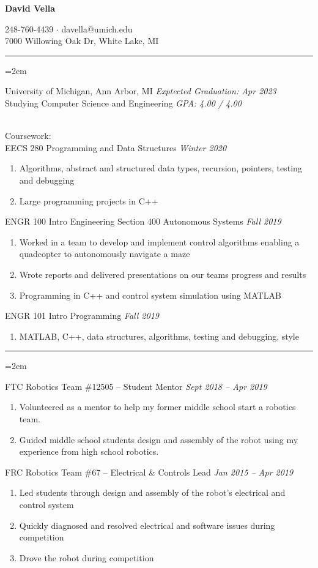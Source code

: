 \documentclass[12pt]{article}
\newcommand{\rheader}[1] { 
    \noindent{ \large \textbf{#1} \par }
    \vspace{-10pt}
    \noindent \rule{7.5in}{0.5pt} 
}
\newcommand{\rdate}[1]{
    \hfill \textit{#1}
}
\newcommand{\ritem} {
    \vspace{-10pt} \item
}
\newenvironment{rsection} {
    \vspace{-5pt}
    \par \medskip
    \leftskip=2em
    \noindent \ignorespaces
} {
    \par \medskip
    \vspace{5pt}
}
\newenvironment{rlist} {
    \begin{enumerate}[leftmargin=0.75in, label=$\bullet$]
} {
    \end{enumerate}
    \vspace{-10pt}
}
\begin{document}
\begin{center}
    {\Large \textbf{David Vella} \par}
    \vspace{5pt}
    248-760-4439 $\cdot$ davella@umich.edu \\
    7000 Willowing Oak Dr, White Lake, MI
\end{center}


\rheader{EDUCATION}
\begin{rsection}
    University of Michigan, Ann Arbor, MI \rdate{Exptected Graduation: Apr 2023} \\
    Studying Computer Science and Engineering \rdate{GPA: 4.00 / 4.00}
    \vspace{5pt} \\
    \noindent Coursework: \\
    EECS 280 Programming and Data Structures \rdate{Winter 2020}
    \begin{rlist}
        \ritem Algorithms, abstract and structured data types, recursion, pointers, testing and debugging
        \ritem Large programming projects in C++
    \end{rlist}
    ENGR 100 Intro Engineering Section 400 Autonomous Systems \rdate{Fall 2019}
    \begin{rlist}
        \ritem Worked in a team to develop and implement control algorithms enabling a quadcopter to autonomously navigate a maze
        \ritem Wrote reports and delivered presentations on our teams progress and results
        \ritem Programming in C++ and control system simulation using MATLAB 
    \end{rlist}
    ENGR 101 Intro Programming \rdate{Fall 2019}
    \begin{rlist}
        \ritem MATLAB, C++, data structures, algorithms, testing and debugging, style 
    \end{rlist}
\end{rsection}


\rheader{PROJECT EXPERIENCE}
\begin{rsection}
    FTC Robotics Team \#12505 -- Student Mentor \rdate{Sept 2018 -- Apr 2019}
    \begin{rlist}
        \ritem Volunteered as a mentor to help my former middle school start a robotics team.
        \ritem Guided middle school students design and assembly of the robot using my experience from high school robotics.
    \end{rlist}
    FRC Robotics Team \#67 -- Electrical \& Controls Lead \rdate{Jan 2015 -- Apr 2019}
    \begin{rlist}
        \ritem Led students through design and assembly of the robot's electrical and control system
        \ritem Quickly diagnosed and resolved electrical and software issues during competition
        \ritem Drove the robot during competition
    \end{rlist}
\end{rsection}
\end{document}
